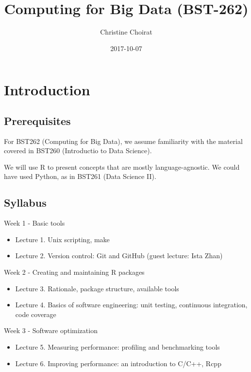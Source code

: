 \documentclass[]{book}
\title{Computing for Big Data (BST-262)}
\author{Christine Choirat}
\date{2017-10-07}
\providecommand{\tightlist}{%
  \setlength{\itemsep}{0pt}\setlength{\parskip}{0pt}}
\theoremstyle{definition}
\theoremstyle{definition}
\theoremstyle{definition}
\theoremstyle{remark}
\begin{document}
\maketitle

{
\setcounter{tocdepth}{1}
\tableofcontents
}
\chapter{Introduction}\label{intro}

\section{Prerequisites}\label{prerequisites}

For BST262 (Computing for Big Data), we assume familiarity with the
material covered in BST260 (Introductio to Data Science).

We will use R to present concepts that are mostly language-agnostic. We
could have used Python, as in BST261 (Data Science II).

\section{Syllabus}\label{syllabus}

Week 1 - Basic tools

\begin{itemize}
\tightlist
\item
  Lecture 1. Unix scripting, make
\item
  Lecture 2. Version control: Git and GitHub (guest lecture: Ista Zhan)
\end{itemize}

Week 2 - Creating and maintaining R packages

\begin{itemize}
\tightlist
\item
  Lecture 3. Rationale, package structure, available tools
\item
  Lecture 4. Basics of software engineering: unit testing, continuous
  integration, code coverage
\end{itemize}

Week 3 - Software optimization

\begin{itemize}
\tightlist
\item
  Lecture 5. Measuring performance: profiling and benchmarking tools
\item
  Lecture 6. Improving performance: an introduction to C/C++, Rcpp
\end{itemize}
\end{document}
